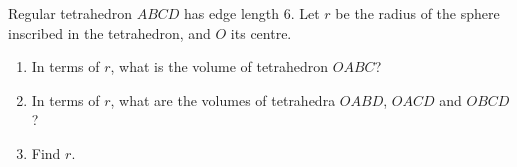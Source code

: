 Regular tetrahedron $ABCD$ has edge length $6$. Let $r$ be the radius of the sphere inscribed in the tetrahedron, and $O$ its centre.
\begin{enumerate}
\item[(a)] In terms of $r$, what is the volume of tetrahedron $OABC$?
\item[(b)] In terms of $r$, what are the volumes of tetrahedra $OABD$, $OACD$ and $OBCD$?
\item[(c)] Find $r$.
\end{enumerate}
